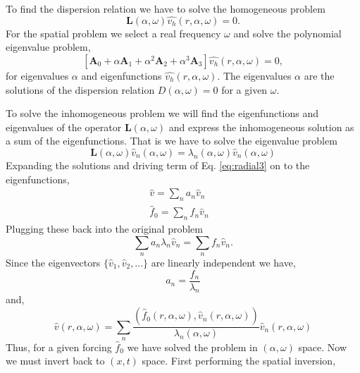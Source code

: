 \documentclass[superscriptaddress, onecolumn, prl]{revtex4}
\begin{document}
To find the dispersion relation we have to solve the homogeneous problem
\begin{equation}
\textbf{L}(\alpha, \omega) \hat{v_h}(r, \alpha, \omega) = 0.
\end{equation}
For the spatial problem we select a real frequency $\omega$ and solve the polynomial eigenvalue problem,
\begin{equation}
\left[ \textbf{A}_0 + \alpha \textbf{A}_1 + \alpha^2 \textbf{A}_2 + \alpha^3 \textbf{A}_3 \right] \hat{v_h}(r, \alpha, \omega)= 0, 
\end{equation}
for eigenvalues $\alpha$ and eigenfunctions $\hat{v_h}(r, \alpha, \omega)$. The eigenvalues $\alpha$ are the solutions of the dispersion relation $D(\alpha, \omega)=0$ for a given $\omega$.

To solve the inhomogeneous problem we will find the eigenfunctions and eigenvalues of the operator $\textbf{L}(\alpha, \omega)$ and express the inhomogeneous solution as a sum of the eigenfunctions. That is we have to solve the eigenvalue problem  
\begin{equation}
\textbf{L}(\alpha, \omega) \hat{v}_n(\alpha, \omega) = \lambda_n(\alpha, \omega) \hat{v}_n(\alpha, \omega)
\end{equation}
Expanding the solutions and driving term of Eq. \ref{eq:radial3} on to the eigenfunctions,
\begin{equation}
\begin{split}
\hat{v} = \sum_n a_n \hat{v}_n \\
\hat{f}_0 = \sum_n f_n \hat{v}_n & 
\end{split}
\end{equation}
Plugging these back into the original problem
\begin{equation}
\sum_n a_n \lambda_n \hat{v}_n = \sum_n f_n \hat{v}_n.
\end{equation}
Since the eigenvectors $\{\hat{v}_1, \hat{v}_2,...\}$ are linearly independent we have,
\begin{equation}
a_n = \frac{f_n}{\lambda_n}
\end{equation}
and,
\begin{equation}
\hat{v}(r, \alpha, \omega) = \sum_n \frac{(\hat{f}_0(r, \alpha, \omega), \hat{v}_n(r, \alpha, \omega))}{\lambda_n(\alpha, \omega)} \hat{v}_n(r, \alpha, \omega)
\end{equation}
Thus, for a given forcing $\hat{f}_0$ we have solved the problem in $(\alpha, \omega)$ space. Now we must invert back to $(x, t)$ space. First performing the spatial inversion,
\end{document}
